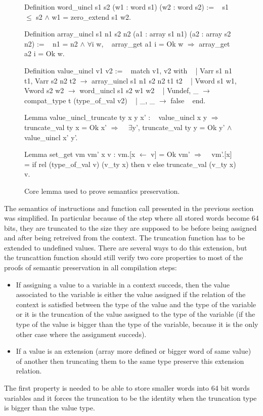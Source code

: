 \documentclass{article}
\begin{document}
\medskip

\begin{figure}[t]
\obeylines\obeyspaces\ttfamily%
Definition word\_uincl s1 s2 (w1 : word s1) (w2 : word s2) :=
~ s1 \(\leq\) s2 \(\wedge\) w1 = zero\_extend s1 w2.

Definition array\_uincl s1 n1 s2 n2 (a1 : array s1 n1) (a2 : array s2 n2) :=
~ n1 = n2 \(\wedge\) \(\forall\)i w,
~   array\_get a1 i = Ok w \(\Longrightarrow\) array\_get a2 i = Ok w.

Definition value\_uincl v1 v2 :=
~ match v1, v2 with
~ | Varr s1 n1 t1, Varr s2 n2 t2 \(\rightarrow\) array\_uincl s1 n1 s2 n2 t1 t2
~ | Vword s1 w1,   Vword s2 w2   \(\rightarrow\) word\_uincl s1 s2 w1 w2
~ | Vundef,        \_             \(\rightarrow\) compat\_type t (type\_of\_val v2)
~ | \_,             \_             \(\rightarrow\) false
~ end.

Lemma value\_uincl\_truncate ty x y x' :
~ value\_uincl x y \(\Longrightarrow\) truncate\_val ty x = Ok x' \(\Longrightarrow\)
~ \(\exists\)y', truncate\_val ty y = Ok y' \(\wedge\) value\_uincl x' y'.

Lemma set\_get vm vm' x v : vm.[x \(\leftarrow\) v] = Ok vm' \(\Longrightarrow\)
~ vm'.[x] = if rel (type\_of\_val v) (v\_ty x) then v else truncate\_val (v\_ty x) v.
\normalfont%
\caption{Core lemma used to prove semantics preservation.}
\end{figure}

The semantics of instructions and function call presented in the previous section
was simplified. In particular because of the step where all stored words become
64 bits, they are truncated to the size they are supposed to be before being
assigned and after being retreived from the context. The truncation function
has to be extended to undefined values. There are several ways to do this
extension, but the truncattion function should still verify two core properties
to most of the proofs of semantic preservation in all compilation steps:
\begin{itemize}
\item If assigning a value to a variable in a context succeds, then the value
  associated to the variable is either the value assigned if the relation of the
  context is satisfied between the type of the value and the type of the
  variable or it is the truncation of the value assigned to the type of the
  variable (if the type of the value is bigger than the type of the variable,
  because it is the only other case where the assignment succeds).
\item If a value is an extension (array more defined or bigger word of same
  value) of another then truncating them to the same type preserve this
  extension relation.
\end{itemize}
The first property is needed to be able to store smaller words into 64 bit words
variables and it forces the truncation to be the identity when the truncation
type is bigger than the value type.
\end{document}
